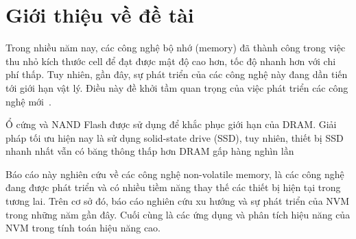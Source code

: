 \section{Giới thiệu về đề tài}
\label{sec:introduction}

Trong nhiều năm nay, các công nghệ bộ nhớ (memory) đã thành công trong việc thu
nhỏ kích thước cell để đạt được mật độ cao hơn, tốc độ nhanh hơn với chi phí
thấp. Tuy nhiên, gần đây, sự phát triển của các công nghệ này đang dần tiến tới
giới hạn vật lý. Điều này đề khởi tầm quan trọng của việc phát triển các công
nghệ mới~\cite{apalkovSpintransferTorqueMagnetic2013}.


Ổ cứng và NAND Flash được sử dụng để khắc phục giới hạn của DRAM. Giải pháp tối
ưu hiện nay là sử dụng solid-state drive (SSD), tuy nhiên, thiết bị SSD nhanh
nhất vẫn có băng thông thấp hơn DRAM gấp hàng nghìn
lần~\cite{mironovPerformanceEvaluationIntel2019}

Báo cáo này nghiên cứu về các công nghệ non-volatile memory, là các công nghệ
đang được phát triển và có nhiều tiềm năng thay thế các thiết bị hiện tại trong
tương lai. Trên cơ sở đó, báo cáo nghiên cứu xu hướng và sự phát triển của NVM
trong những năm gần đây. Cuối cùng là các ứng dụng và phân tích hiệu năng của
NVM trong tính toán hiệu năng cao.